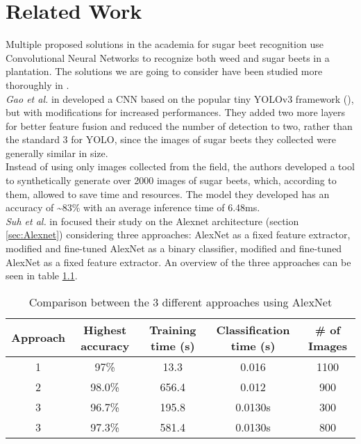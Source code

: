 \chapter{Related Work}
Multiple proposed solutions in the academia for sugar beet recognition use Convolutional Neural Networks to recognize both weed and sugar beets in a plantation. The solutions we are going to consider have been studied more thoroughly in \cite{project_work}. \\
\textit{Gao et al. } in \cite{gao_deep_2020} developed a CNN based on the popular tiny YOLOv3 framework (\cite{9074315}), but with modifications for increased performances. They added two more layers for better feature fusion and reduced the number of detection to two, rather than the standard 3 for YOLO, since the images of sugar beets they collected were generally similar in size.\\
Instead of using only images collected from the field, the authors developed a tool to synthetically generate over 2000 images of sugar beets, which, according to them, allowed to save time and resources. The model they developed has an accuracy of \textasciitilde83\% with an average inference time of 6.48ms.\\
\textit{Suh et al.} in \cite{suh_transfer_2018} focused their study on the Alexnet architecture (section \ref{sec:Alexnet}) considering three approaches: AlexNet as a fixed feature extractor, modified and fine-tuned AlexNet as a binary classifier, modified and fine-tuned AlexNet as a fixed feature extractor. An overview of the three approaches can be seen in table \ref{tab:alexnet_comparison}. 
\begin{table}[h]
\begin{tabular}[h]{ c c  c c c}
\hline
Approach & Highest accuracy & Training time (s) & Classification time (s) &\# of Images\\
\hline
  1	&	97\%		& 	13.3		&	0.016	&	1100 \\
  2 	& 	98.0\% 	& 	656.4	&	0.012	&	900 \\
  3 	& 	96.7\% 	& 	195.8 	&	0.0130s 	& 	300\\
  3 	& 	97.3\% 	& 	581.4 	&	0.0130s 	& 	800\\

\end{tabular}

\caption[Comparison between the 3 different approaches using AlexNet]{Comparison between the 3 different approaches using AlexNet\cite{suh_transfer_2018}}
 \label{tab:alexnet_comparison}
\end{table}

